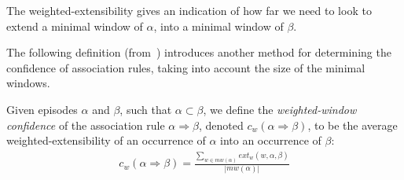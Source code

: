 The weighted-extensibility gives an indication of how far we need to look to extend a minimal window of $ \alpha $, into a minimal window of $ \beta $.


The following definition (from~\citep{cule2014marbles}) introduces another method for determining the confidence of association rules, taking into account the size of the minimal windows.

\begin{definition} \label{def:weighted-window-confidence}
Given episodes $ \alpha $ and $ \beta $, such that $ \alpha \subset \beta $, we define the \emph{weighted-window confidence} of the association rule $ \alpha \Rightarrow \beta $, denoted $ c_w(\alpha \Rightarrow \beta) $, to be the average weighted-extensibility of an occurrence of $ \alpha $ into an occurrence of $ \beta $:
\begin{align*}
c_w(\alpha \Rightarrow \beta) = \frac{\sum_{w \in mw(\alpha)} ext_w(w, \alpha, \beta)}{| mw(\alpha) |}
\end{align*}
\end{definition}

